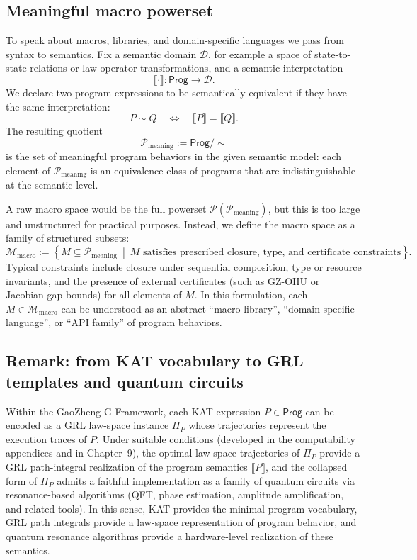 \documentclass[11pt]{book}
\theoremstyle{plain}
\theoremstyle{definition}
\theoremstyle{remark}
\begin{document}
\subsection*{Meaningful macro powerset}

To speak about macros, libraries, and domain-specific languages we
pass from syntax to semantics. Fix a semantic domain $\mathcal{D}$,
for example a space of state-to-state relations or law-operator
transformations, and a semantic interpretation
\[
  \llbracket\cdot\rrbracket : \mathsf{Prog} \to \mathcal{D}.
\]
We declare two program expressions to be semantically equivalent if
they have the same interpretation:
\[
  P \sim Q
  \quad\Longleftrightarrow\quad
  \llbracket P\rrbracket = \llbracket Q\rrbracket.
\]
The resulting quotient
\[
  \mathcal{P}_{\mathrm{meaning}}
  :=
  \mathsf{Prog} / \sim
\]
is the set of meaningful program behaviors in the given semantic
model: each element of $\mathcal{P}_{\mathrm{meaning}}$ is an
equivalence class of programs that are indistinguishable at the
semantic level.

A raw macro space would be the full powerset
$\mathcal{P}(\mathcal{P}_{\mathrm{meaning}})$, but this is too large
and unstructured for practical purposes. Instead, we define the
macro space as a family of structured subsets:
\[
  \mathcal{M}_{\mathrm{macro}}
  :=
  \left\{
    M \subseteq \mathcal{P}_{\mathrm{meaning}}
    \ \middle|\ 
    M \text{ satisfies prescribed closure, type, and certificate constraints}
  \right\}.
\]
Typical constraints include closure under sequential composition,
type or resource invariants, and the presence of external certificates
(such as GZ-OHU or Jacobian-gap bounds) for all elements of $M$.
In this formulation, each $M\in\mathcal{M}_{\mathrm{macro}}$ can be
understood as an abstract ``macro library'', ``domain-specific
language'', or ``API family'' of program behaviors.

\subsection*{Remark: from KAT vocabulary to GRL templates and quantum circuits}

Within the GaoZheng G-Framework, each KAT expression
$P\in\mathsf{Prog}$ can be encoded as a GRL law-space instance
$\Pi_P$ whose trajectories represent the execution traces of $P$.
Under suitable conditions (developed in the computability appendices
and in Chapter~9), the optimal law-space trajectories of $\Pi_P$
provide a GRL path-integral realization of the program semantics
$\llbracket P\rrbracket$, and the collapsed form of $\Pi_P$ admits a
faithful implementation as a family of quantum circuits via
resonance-based algorithms (QFT, phase estimation, amplitude
amplification, and related tools). In this sense, KAT provides the
minimal program vocabulary, GRL path integrals provide a law-space
representation of program behavior, and quantum resonance algorithms
provide a hardware-level realization of these semantics.
\end{document}
